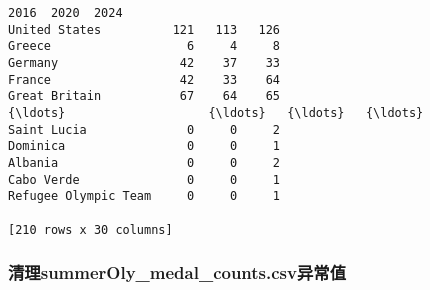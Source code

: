 \documentclass[11pt]{article}
\begin{document}
\begin{Verbatim}[commandchars=\\\{\}]
                      2016  2020  2024
United States          121   113   126
Greece                   6     4     8
Germany                 42    37    33
France                  42    33    64
Great Britain           67    64    65
{\ldots}                    {\ldots}   {\ldots}   {\ldots}
Saint Lucia              0     0     2
Dominica                 0     0     1
Albania                  0     0     2
Cabo Verde               0     0     1
Refugee Olympic Team     0     0     1

[210 rows x 30 columns]
    \end{Verbatim}

    \subsubsection{清理summerOly\_medal\_counts.csv异常值}\label{ux6e05ux7406summeroly_medal_counts.csvux5f02ux5e38ux503c}
\end{document}
